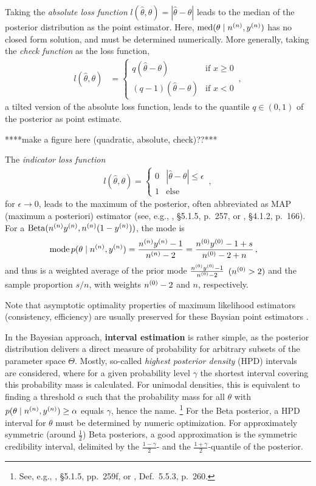 Taking the \emph{absolute loss function} $l(\hat{\theta}, \theta) = |\hat{\theta}-\theta|$
leads to the median of the posterior distribution as the point estimator.
Here, $\operatorname{med}(\theta\mid n^{(n)}, y^{(n)})$ has no closed form solution, and must be determined numerically.
More generally, taking the \emph{check function} as the loss function,
\begin{align*}
l(\hat{\theta}, \theta) &= \begin{cases} q (\hat{\theta}-\theta)     & \text{if } x \ge 0 \\
                                         (q-1) (\hat{\theta}-\theta) & \text{if } x < 0 \end{cases}\,,
\end{align*}
a tilted version of the absolute loss function, 
leads to the quantile $q \in (0,1)$ of the posterior as point estimate.

****make a figure here (quadratic, absolute, check)??***

The \emph{indicator loss function}
\begin{align*}
l(\hat{\theta}, \theta) = \begin{cases} 0 & |\hat{\theta}-\theta| \le \epsilon \\ 1 & \text{else}\end{cases}\,,
\end{align*}
for $\epsilon \to 0$, leads to the maximum of the posterior,
often abbreviated as MAP (maximum a posteriori) estimator
(see, e.g., \cite{2000:bernardosmith}, \S 5.1.5, p.~257, or \cite{2007:robert}, \S 4.1.2, p.~166).
For a $\operatorname{Beta}(n^{(n)}y^{(n)}, n^{(n)}(1-y^{(n)}))$, the mode is
\begin{align*}
\operatorname{mode} p(\theta\mid n^{(n)}, y^{(n)}) &= \frac{n^{(n)}y^{(n)} - 1}{n^{(n)} - 2} = \frac{n^{(0)}y^{(0)} - 1 + s}{n^{(0)} - 2 + n}\,,
\end{align*}
and thus is a weighted average of the prior mode $\frac{n^{(0)}y^{(0)} - 1}{n^{(0)} -2}$ $(n^{(0)} > 2)$
and the sample proportion $s/n$, with weights $n^{(0)} - 2$ and $n$, respectively.

Note that asymptotic optimality properties of maximum likelihood estimators (consistency, efficiency)
are usually preserved for these Baysian point estimators \parencite[e.g.,][Note~1.8.4, pp.~48f]{2007:robert}.

In the Bayesian approach, \textbf{interval estimation} is rather simple,
as the posterior distribution delivers a direct measure of probability for arbitrary subsets of the parameter space $\Theta$.
Mostly, so-called \emph{highest posterior density} (HPD) intervals are considered,
where for a given probability level $\gamma$ the shortest interval covering this probability mass is calculated.
For unimodal densities, this is equivalent to finding a threshold $\alpha$ such that
the probability mass for all $\theta$ with $p(\theta\mid n^{(n)}, y^{(n)}) \ge \alpha$ equals $\gamma$, hence the name.%
\footnote{See, e.g., \textcite{2000:bernardosmith}, \S 5.1.5, pp.~259f, or \textcite{2007:robert}, Def.~5.5.3, p.~260.}
For the Beta posterior, a HPD interval for $\theta$ must be determined by numeric optimization.
For approximately symmetric (around $\frac{1}{2}$) Beta posteriors, a good approximation is the symmetric credibility interval,
delimited by the $\frac{1-\gamma}{2}$- and the $\frac{1+\gamma}{2}$-quantile of the posterior.

